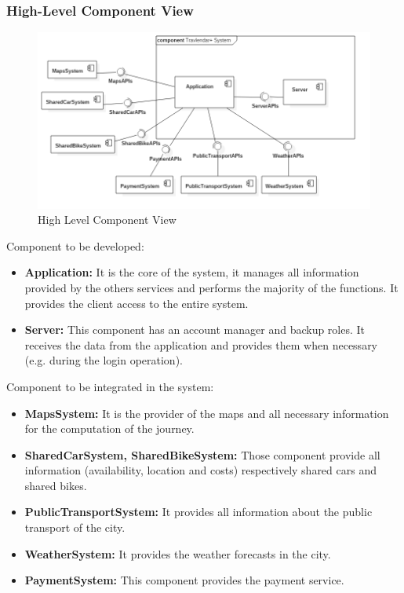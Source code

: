 \subsubsection{High-Level Component View}
\begin{figure}[!h]
\centering
\includegraphics[scale=0.4]{images/ComponentDiagramSystem}
\caption{High Level Component View}
\label{ref:highlevelcomponentview}
\end{figure}
Component to be developed:
\begin{itemize}
\item
\textbf{Application:} It is the core of the system, it manages all information provided by the others services and performs the majority of the functions. It provides the client access to the entire system.
\item
\textbf{Server:} This component has an account manager and backup roles. It receives the data from the application and provides them when necessary (e.g. during the login operation).
\end{itemize}
Component to be integrated in the system:
\begin{itemize}
\item
\textbf{MapsSystem:} It is the provider of the maps and all necessary information for the computation of the journey.
\item
\textbf{SharedCarSystem, SharedBikeSystem:} Those component provide all information (availability, location and costs) respectively shared cars and shared bikes.
\item
\textbf{PublicTransportSystem:} It provides all information about the public transport of the city.
\item
\textbf{WeatherSystem:} It provides the weather forecasts in the city.
\item
\textbf{PaymentSystem:} This component provides the payment service.
\end{itemize}

